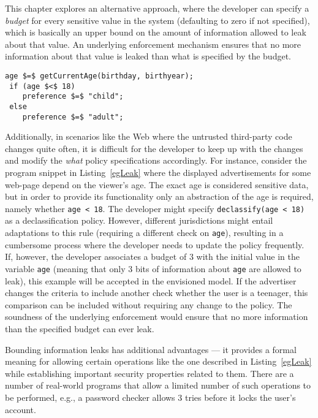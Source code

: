 This chapter explores an alternative approach, where the developer can
specify a \emph{budget} for every sensitive value in the system
(defaulting to zero if not specified), which is basically an upper
bound on the amount of information allowed to leak about that
value. An underlying enforcement mechanism ensures that no more
information about that value is leaked than what is specified by the
budget.  

\begin{lstlisting}[float,belowskip=-0.5em,caption=Age-based Advertisement, label=egLeak]
 age $=$ getCurrentAge(birthday, birthyear);
 if (age $<$ 18)
    preference $=$ "child";
 else
    preference $=$ "adult";
\end{lstlisting}

Additionally, in scenarios
like the Web where the untrusted third-party code changes quite often,
it is difficult for the developer to keep up with the changes and
modify the \emph{what} policy specifications accordingly. For
instance, consider the program snippet in Listing~\ref{egLeak} where
the displayed advertisements for some web-page depend on the viewer's
age. The exact age is considered sensitive data, but in order to
provide its functionality only  an abstraction of the age is required,
namely whether \lstinline{age < 18}. The developer might specify
\lstinline{declassify(age < 18)} as a declassification policy.
However, different jurisdictions might entail adaptations to this rule  
(requiring a different check on \lstinline{age}), resulting in a
cumbersome process where the developer needs to update the policy
frequently. If, however, the developer associates a budget of $3$ with
the initial value in the variable \lstinline{age} (meaning that only
$3$ bits of information about \lstinline{age} are allowed to leak),
this example will be accepted in the envisioned model. If the
advertiser changes the criteria to include another check whether the
user is a teenager, this comparison can be included without requiring 
any change to the policy. The soundness of the underlying enforcement 
would ensure that no more information than the specified budget can
ever leak.  

Bounding information leaks has additional advantages --- it provides 
a formal meaning for allowing certain operations like the one 
described in Listing~\ref{egLeak} while establishing important
security properties related to them. There are a number of 
real-world programs that allow a limited number of such 
operations to be performed, e.g., a password checker allows $3$ tries
before it locks the user's account. 

